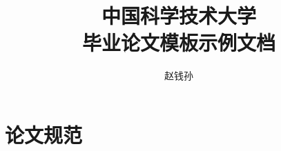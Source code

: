 \documentclass[doctor]{ustcthesis}
\title{中国科学技术大学\\毕业论文模板示例文档}
\author{赵钱孙}
\begin{document}
\maketitle

%
%
%

\frontmatter

\tableofcontents
\listoffigures
\listoftables
\listofalgorithms  %
% 

\mainmatter









\appendix
\chapter{论文规范}

\backmatter


\end{document}
